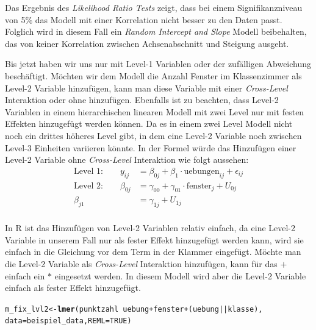 \documentclass[12pt, a4paper]{article}\usepackage[]{graphicx}\usepackage[]{color}
\makeatletter
\newcommand{\hlnum}[1]{\textcolor[rgb]{0.686,0.059,0.569}{#1}}%
\newcommand{\hlopt}[1]{\textcolor[rgb]{0,0,0}{#1}}%
\newcommand{\hlstd}[1]{\textcolor[rgb]{0.345,0.345,0.345}{#1}}%
\newcommand{\hlkwb}[1]{\textcolor[rgb]{0.69,0.353,0.396}{#1}}%
\newcommand{\hlkwc}[1]{\textcolor[rgb]{0.333,0.667,0.333}{#1}}%
\newcommand{\hlkwd}[1]{\textcolor[rgb]{0.737,0.353,0.396}{\textbf{#1}}}%
\newenvironment{kframe}{%
 \def\at@end@of@kframe{}%
 \ifinner\ifhmode%
  \def\at@end@of@kframe{\end{minipage}}%
  \begin{minipage}{\columnwidth}%
 \fi\fi%
 \def\FrameCommand##1{\hskip\@totalleftmargin \hskip-\fboxsep
 \colorbox{shadecolor}{##1}\hskip-\fboxsep
     \hskip-\linewidth \hskip-\@totalleftmargin \hskip\columnwidth}%
 \MakeFramed {\advance\hsize-\width
   \@totalleftmargin\z@ \linewidth\hsize
   \@setminipage}}%
 {\par\unskip\endMakeFramed%
 \at@end@of@kframe}
\newenvironment{knitrout}{}{} %
\makeatother
\begin{document}
Das Ergebnis des \textit{Likelihood Ratio Tests} zeigt, dass bei einem Signifikanzniveau von 5\% das Modell mit einer Korrelation nicht besser zu den Daten passt. Folglich wird in diesem Fall ein \textit{Random Intercept and Slope} Modell beibehalten, das von keiner Korrelation zwischen Achsenabschnitt und Steigung ausgeht.

Bis jetzt haben wir uns nur mit Level-1 Variablen oder der zufälligen Abweichung beschäftigt. Möchten wir dem Modell die Anzahl Fenster im Klassenzimmer als Level-2 Variable hinzufügen, kann man diese Variable mit einer \textit{Cross-Level} Interaktion oder ohne hinzufügen. Ebenfalls ist zu beachten, dass Level-2 Variablen in einem hierarchischen linearen Modell mit zwei Level nur mit festen Effekten hinzugefügt werden können. Da es in einem zwei Level Modell nicht noch ein drittes höheres Level gibt, in dem eine Level-2 Variable noch zwischen Level-3 Einheiten variieren könnte. In der Formel würde das Hinzufügen einer Level-2 Variable ohne \textit{Cross-Level} Interaktion wie folgt aussehen:
\begin{equation} 
\begin{split}	
 \text{Level 1:}  \qquad y_{ij} & = \beta_{0j} + \beta_{1} \cdot \text{uebungen}_{ij} + \epsilon_{ij}\\
 \text{Level 2:} \qquad \beta_{0j} & = \gamma_{00} + \gamma_{01} \cdot \text{fenster}_{j} + U_{0j}\\
 \beta_{j1} & = \gamma_{1j} + U_{1j}\\
\end{split}	
\end{equation} 

In R ist das Hinzufügen von Level-2 Variablen relativ einfach, da eine Level-2 Variable in unserem Fall nur als fester Effekt hinzugefügt werden kann, wird sie einfach in die Gleichung vor dem Term in der Klammer eingefügt. Möchte man die Level-2 Variable als \textit{Cross-Level} Interaktion hinzufügen, kann für das $+$ einfach ein $*$ eingesetzt werden. In diesem Modell wird aber die Level-2 Variable einfach als fester Effekt hinzugefügt.

\singlespacing
\begin{knitrout}
\color{fgcolor}\begin{kframe}
\begin{alltt}
\hlstd{m_fix_lvl2} \hlkwb{<-} \hlkwd{lmer}\hlstd{(punktzahl} \hlopt{~} \hlstd{uebung} \hlopt{+} \hlstd{fenster} \hlopt{+} \hlstd{(uebung} \hlopt{||} \hlstd{klasse),}
        \hlkwc{data} \hlstd{= beispiel_data,} \hlkwc{REML} \hlstd{=} \hlnum{TRUE}\hlstd{)}
\end{alltt}
\end{kframe}
\end{knitrout}
\end{document}
